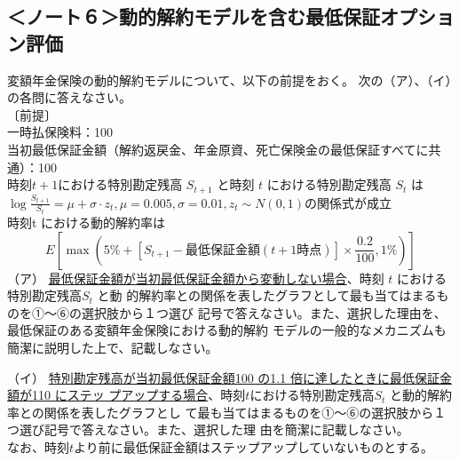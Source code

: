 \documentclass[report,gutter=10mm,fore-edge=10mm,uplatex,dvipdfmx]{jlreq}
\begin{document}
{\subsection{＜ノート６＞動的解約モデルを含む最低保証オプション評価}
変額年金保険の動的解約モデルについて、以下の前提をおく。
次の（ア）、（イ）の各問に答えなさい。\\
〔前提〕\\
一時払保険料：100\\
当初最低保証金額（解約返戻金、年金原資、死亡保険金の最低保証すべてに共通）：100\\
時刻$t +1$における特別勘定残高 $S_{t+1}$ と時刻 $t$ における特別勘定残高 $S_t$ は\\
$\log{\frac{S_{t+1}}{S_t}}=\mu+\sigma\cdot z_t, \mu=0.005, \sigma=0.01, z_t\sim N(0,1)$の関係式が成立\\
時刻t における動的解約率は
$$
E\left[\max{\left(5\%+\left[S_{t+1}-\text{最低保証金額}(t+1時点)\right]\times\frac{0.2}{100},1\%\right)}\right]
$$
（ア） \underline{最低保証金額が当初最低保証金額から変動しない場合}、時刻 $t$ における特別勘定残高$S_t$ と動
的解約率との関係を表したグラフとして最も当てはまるものを①～⑥の選択肢から１つ選び
記号で答えなさい。また、選択した理由を、最低保証のある変額年金保険における動的解約
モデルの一般的なメカニズムも簡潔に説明した上で、記載しなさい。

（イ） \underline{特別勘定残高が当初最低保証金額100 の1.1 倍に達したときに最低保証金額が110 にステッ
プアップする場合}、時刻$t$における特別勘定残高$S_t$ と動的解約率との関係を表したグラフとし
て最も当てはまるものを①～⑥の選択肢から１つ選び記号で答えなさい。また、選択した理
由を簡潔に記載しなさい。\\
なお、時刻$t$より前に最低保証金額はステップアップしていないものとする。

}
\end{document}
